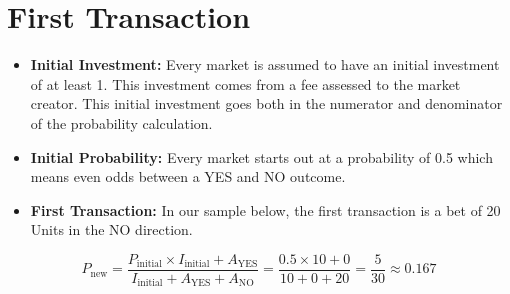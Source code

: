 \documentclass{article}
\newcommand{\piechart}[3]{ %
  \draw (#1,#2) circle (0.5); %
  \pgfmathsetmacro{\startangle}{90}
  \pgfmathsetmacro{\endangle}{90 - 360 * #3} %
  \filldraw[fill=cyan!50] (#1,#2) -- ++(\startangle:0.5) arc (\startangle:\endangle:0.5) -- cycle; %
}
\begin{document}
\newpage

\section{First Transaction}

\begin{itemize}
    \item \textbf{Initial Investment:} Every market is assumed to have an initial investment of at least 1. This investment comes from a fee assessed to the market creator. This initial investment goes both in the numerator and denominator of the probability calculation.
    \item \textbf{Initial Probability:} Every market starts out at a probability of 0.5 which means even odds between a YES and NO outcome.
    \item \textbf{First Transaction:} In our sample below, the first transaction is a bet of 20 Units in the NO direction.
\end{itemize}

\begin{center}

\end{center}

\[
P_{\text{new}} = \frac{P_{\text{initial}} \times I_{\text{initial}} + A_{\text{YES}}}{I_{\text{initial}} + A_{\text{YES}} + A_{\text{NO}}} = \frac{0.5 \times 10 + 0}{10 + 0 + 20} = \frac{5}{30} \approx 0.167
\]
\end{document}
